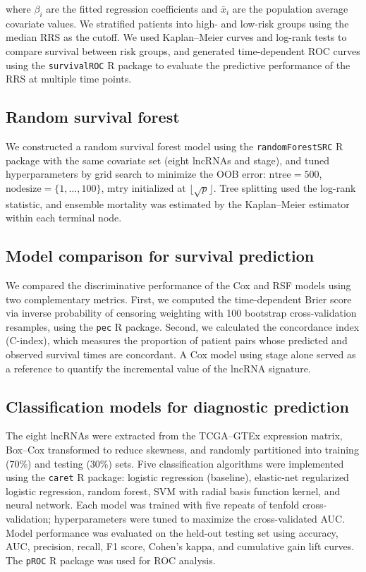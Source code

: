 \documentclass[fleqn,10pt]{wlscirep}
\begin{document}
where $\beta_i$ are the fitted regression coefficients and $\bar{x}_i$ are the population average covariate values. We stratified patients into high- and low-risk groups using the median RRS as the cutoff. We used Kaplan--Meier curves and log-rank tests to compare survival between risk groups, and generated time-dependent ROC curves using the \texttt{survivalROC} R package\cite{RN30} to evaluate the predictive performance of the RRS at multiple time points\cite{RN29}.

\subsection*{Random survival forest}

We constructed a random survival forest model using the \texttt{randomForestSRC} R package\cite{RN31} with the same covariate set (eight lncRNAs and stage), and tuned hyperparameters by grid search to minimize the OOB error: $\text{ntree} = 500$, $\text{nodesize} = \{1, \dots, 100\}$, $\text{mtry}$ initialized at $\lfloor\sqrt{p}\rfloor$. Tree splitting used the log-rank statistic, and ensemble mortality was estimated by the Kaplan--Meier estimator within each terminal node.

\subsection*{Model comparison for survival prediction}

We compared the discriminative performance of the Cox and RSF models using two complementary metrics. First, we computed the time-dependent Brier score via inverse probability of censoring weighting with 100 bootstrap cross-validation resamples, using the \texttt{pec} R package\cite{RN32}. Second, we calculated the concordance index (C-index), which measures the proportion of patient pairs whose predicted and observed survival times are concordant. A Cox model using stage alone served as a reference to quantify the incremental value of the lncRNA signature.

\subsection*{Classification models for diagnostic prediction}

The eight lncRNAs were extracted from the TCGA--GTEx expression matrix, Box--Cox transformed to reduce skewness, and randomly partitioned into training (70\%) and testing (30\%) sets. Five classification algorithms were implemented using the \texttt{caret} R package\cite{RN16}: logistic regression (baseline), elastic-net regularized logistic regression, random forest, SVM with radial basis function kernel, and neural network. Each model was trained with five repeats of tenfold cross-validation; hyperparameters were tuned to maximize the cross-validated AUC. Model performance was evaluated on the held-out testing set using accuracy, AUC, precision, recall, F1 score, Cohen's kappa, and cumulative gain lift curves. The \texttt{pROC} R package\cite{RN33} was used for ROC analysis.
\end{document}

